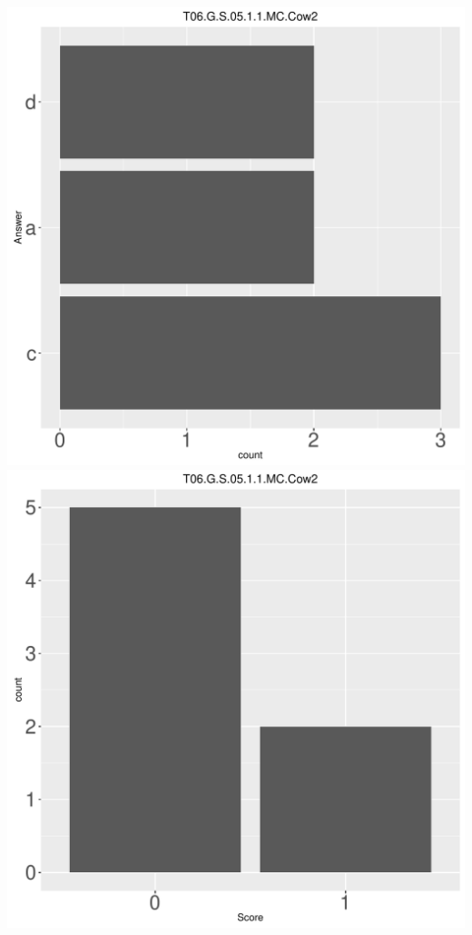 \documentclass[12pt,english,nohyper]{tufte-handout}\usepackage[]{graphicx}\usepackage[]{color}
\begin{document}
\begin{center} \includegraphics[width=.45\linewidth]{Topic06_AB_79_answer} \includegraphics[width=.45\linewidth]{Topic06_AB_79_score} \end{center} 
\end{document}
